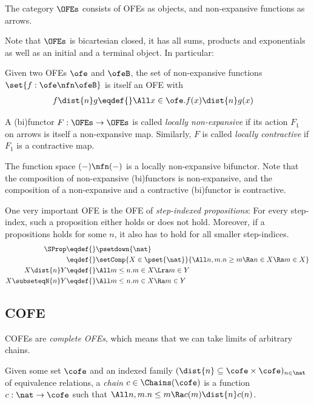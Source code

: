 \begin{defn}
  The category $\OFEs$ consists of OFEs as objects, and non-expansive functions as arrows.
\end{defn}

Note that $\OFEs$ is bicartesian closed, \ie it has all sums, products and exponentials as well as an initial and a terminal object.
In particular:
\begin{defn}
  Given two OFEs $\ofe$ and $\ofeB$, the set of non-expansive functions $\set{f : \ofe \nfn \ofeB}$ is itself an OFE with
  \begin{align*}
    f \dist{n} g \eqdef{}& \All x \in \ofe. f(x) \dist{n} g(x)
  \end{align*}
\end{defn}

\begin{defn}
  A (bi)functor $F : \OFEs \to \OFEs$ is called \emph{locally non-expansive} if its action $F_1$ on arrows is itself a non-expansive map.
  Similarly, $F$ is called \emph{locally contractive} if $F_1$ is a contractive map.
\end{defn}
The function space $(-) \nfn (-)$ is a locally non-expansive bifunctor.
Note that the composition of non-expansive (bi)functors is non-expansive, and the composition of a non-expansive and a contractive (bi)functor is contractive.

One very important OFE is the OFE of \emph{step-indexed propositions}:
For every step-index, such a proposition either holds or does not hold.
Moreover, if a propositions holds for some $n$, it also has to hold for all smaller step-indices.
\begin{align*}
  \SProp \eqdef{}& \psetdown{\nat} \\
    \eqdef{}& \setComp{X \in \pset{\nat}}{ \All n, m. n \geq m \Ra n \in X \Ra m \in X } \\
  X \dist{n} Y \eqdef{}& \All m \leq n. m \in X \Lra m \in Y \\
  X \subseteqN{n} Y \eqdef{}& \All m \leq n. m \in X \Ra m \in Y
\end{align*}

\subsection{COFE}

COFEs are \emph{complete OFEs}, which means that we can take limits of arbitrary chains.

\begin{defn}[Chain]
  Given some set $\cofe$ and an indexed family $({\dist{n}} \subseteq \cofe \times \cofe)_{n \in \nat}$ of equivalence relations, a \emph{chain} $c \in \Chains(\cofe)$ is a function $c : \nat \to \cofe$ such that $\All n, m. n \leq m \Ra c (m) \dist{n} c (n)$.
\end{defn}

